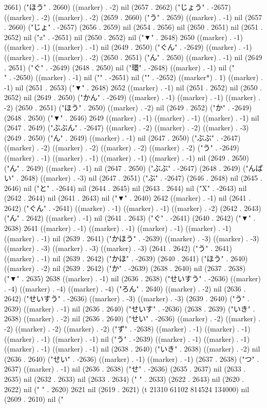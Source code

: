 2661) ("ほう" . 2660) ((marker) . -2) nil (2657 . 2662) ("じょう" . -2657) ((marker) . -2) ((marker) . -2) (2659 . 2660) ("う" . 2659) ((marker) . -1) nil (2657 . 2660) ("じょ" . -2657) (2656 . 2659) nil (2654 . 2656) nil (2650 . 2651) nil (2651 . 2652) nil ("z" . -2651) nil (2650 . 2652) nil ("▼" . 2648) 2650 ((marker) . -1) ((marker) . -1) ((marker) . -1) nil (2649 . 2650) ("ぐん" . -2649) ((marker) . -1) ((marker) . -1) ((marker) . -2) (2650 . 2651) ("ん" . 2650) ((marker) . -1) nil (2649 . 2651) ("ぐ" . -2649) (2648 . 2650) nil ("環" . -2648) ((marker) . -1) nil ("\\" . -2650) ((marker) . -1) nil ("{" . -2651) nil ("}" . -2652) ((marker*) . 1) ((marker) . -1) nil (2651 . 2653) ("▼" . 2648) 2652 ((marker) . -1) nil (2651 . 2652) nil (2650 . 2652) nil (2649 . 2650) ("かん" . -2649) ((marker) . -1) ((marker) . -1) ((marker) . -2) (2650 . 2651) ("ほう" . 2650) ((marker) . -2) nil (2649 . 2652) ("か" . -2649) (2648 . 2650) ("▼" . 2646) 2649 ((marker) . -1) ((marker) . -1) ((marker) . -1) nil (2647 . 2649) ("ぶぶん" . -2647) ((marker) . -2) ((marker) . -2) ((marker) . -3) (2649 . 2650) ("ん" . 2649) ((marker) . -1) nil (2647 . 2650) ("ぶぶ" . -2647) ((marker) . -2) ((marker) . -2) ((marker) . -2) ((marker) . -2) ("う" . -2649) ((marker) . -1) ((marker) . -1) ((marker) . -1) ((marker) . -1) nil (2649 . 2650) ("ん" . 2649) ((marker) . -1) nil (2647 . 2650) ("ぶぶ" . -2647) (2648 . 2649) ("んぱい" . 2648) ((marker) . -3) nil (2647 . 2651) ("ぶ" . -2647) (2646 . 2648) nil (2645 . 2646) nil ("と" . -2644) nil (2644 . 2645) nil (2643 . 2644) nil ("X" . -2643) nil (2642 . 2644) nil (2641 . 2643) nil ("▼" . 2640) 2642 ((marker) . -1) nil (2641 . 2642) ("ぐん" . -2641) ((marker) . -1) ((marker) . -1) ((marker) . -2) (2642 . 2643) ("ん" . 2642) ((marker) . -1) nil (2641 . 2643) ("ぐ" . -2641) (2640 . 2642) ("▼" . 2638) 2641 ((marker) . -1) ((marker) . -1) ((marker) . -1) ((marker) . -1) ((marker) . -1) nil (2639 . 2641) ("かほう" . -2639) ((marker) . -3) ((marker) . -3) ((marker) . -3) ((marker) . -3) ((marker) . -3) (2641 . 2642) ("う" . 2641) ((marker) . -1) nil (2639 . 2642) ("かほ" . -2639) (2640 . 2641) ("ほう" . 2640) ((marker) . -2) nil (2639 . 2642) ("か" . -2639) (2638 . 2640) nil (2637 . 2638) ("▼" . 2635) 2638 ((marker) . -1) nil (2636 . 2638) ("せいすう" . -2636) ((marker) . -4) ((marker) . -4) ((marker) . -4) ("ろん" . 2640) ((marker) . -2) nil (2636 . 2642) ("せいすう" . -2636) ((marker) . -3) ((marker) . -3) (2639 . 2640) ("う" . 2639) ((marker) . -1) nil (2636 . 2640) ("せいす" . -2636) (2638 . 2639) ("いき" . 2638) ((marker) . -2) nil (2636 . 2640) ("せい" . -2636) ((marker) . -2) ((marker) . -2) ((marker) . -2) ((marker) . -2) ("ず" . -2638) ((marker) . -1) ((marker) . -1) ((marker) . -1) ((marker) . -1) nil ("う" . -2639) ((marker) . -1) ((marker) . -1) ((marker) . -1) ((marker) . -1) nil (2638 . 2640) ("いき" . 2638) ((marker) . -2) nil (2636 . 2640) ("せい" . -2636) ((marker) . -1) ((marker) . -1) (2637 . 2638) ("つ" . 2637) ((marker) . -1) nil (2636 . 2638) ("せ" . -2636) (2635 . 2637) nil (2633 . 2635) nil (2632 . 2633) nil (2633 . 2634) ("  " . 2633) (2622 . 2643) nil (2620 . 2622) nil (" " . 2620) 2621 nil (2619 . 2621) (t 21310 61102 814524 134000) nil (2609 . 2610) nil ("
